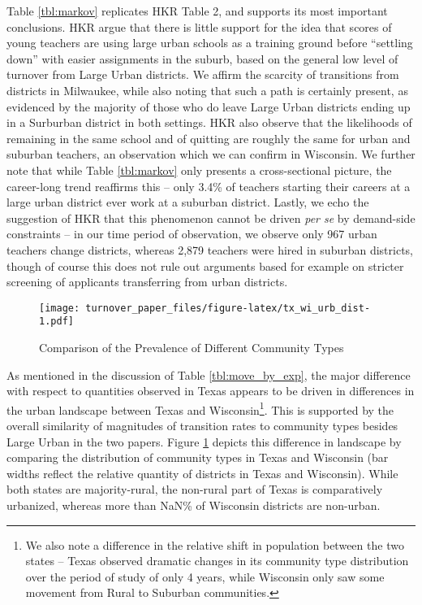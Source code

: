 \documentclass[]{article}
\let\rmarkdownfootnote\footnote%
\def\footnote{\protect\rmarkdownfootnote}
\begin{document}
Table \ref{tbl:markov} replicates HKR Table 2, and supports its most
important conclusions. HKR argue that there is little support for the
idea that scores of young teachers are using large urban schools as a
training ground before ``settling down'' with easier assignments in the
suburb, based on the general low level of turnover from Large Urban
districts. We affirm the scarcity of transitions from districts in
Milwaukee, while also noting that such a path is certainly present, as
evidenced by the majority of those who do leave Large Urban districts
ending up in a Surburban district in both settings. HKR also observe
that the likelihoods of remaining in the same school and of quitting are
roughly the same for urban and suburban teachers, an observation which
we can confirm in Wisconsin. We further note that while Table
\ref{tbl:markov} only presents a cross-sectional picture, the
career-long trend reaffirms this -- only 3.4\% of teachers starting
their careers at a large urban district ever work at a suburban
district. Lastly, we echo the suggestion of HKR that this phenomenon
cannot be driven \emph{per se} by demand-side constraints -- in our time
period of observation, we observe only 967 urban teachers change
districts, whereas 2,879 teachers were hired in suburban districts,
though of course this does not rule out arguments based for example on
stricter screening of applicants transferring from urban districts.

\begin{figure}[htbp]
\centering
\texttt{[image: turnover\_paper\_files/figure-latex/tx\_wi\_urb\_dist-1.pdf]}
\caption{\label{fig:ti_wi_urb}Comparison of the Prevalence of Different
Community Types}
\end{figure}

As mentioned in the discussion of Table \ref{tbl:move_by_exp}, the major
difference with respect to quantities observed in Texas appears to be
driven in differences in the urban landscape between Texas and
Wisconsin\footnote{We also note a difference in the relative shift in
  population between the two states -- Texas observed dramatic changes
  in its community type distribution over the period of study of only 4
  years, while Wisconsin only saw some movement from Rural to Suburban
  communities.}. This is supported by the overall similarity of
magnitudes of transition rates to community types besides Large Urban in
the two papers. Figure \ref{fig:ti_wi_urb} depicts this difference in
landscape by comparing the distribution of community types in Texas and
Wisconsin (bar widths reflect the relative quantity of districts in
Texas and Wisconsin). While both states are majority-rural, the
non-rural part of Texas is comparatively urbanized, whereas more than
NaN\% of Wisconsin districts are non-urban.
\end{document}
